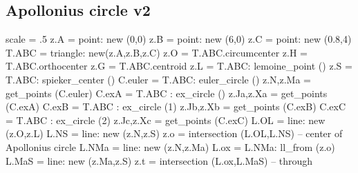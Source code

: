 \hspace*{\fill}
\hspace*{\fill}

\subsection{Apollonius circle v2} %
\label{sub:apollonius_circle_v2}
 \begin{tkzexample}
\begin{tkzelements}
   scale       = .5
   z.A         = point: new (0,0)
   z.B         = point: new (6,0)
   z.C         = point: new (0.8,4)
   T.ABC       = triangle: new(z.A,z.B,z.C)
   z.O         = T.ABC.circumcenter
   z.H         = T.ABC.orthocenter
   z.G         = T.ABC.centroid
   z.L         = T.ABC: lemoine_point ()
   z.S         = T.ABC: spieker_center ()
   C.euler     = T.ABC: euler_circle ()
   z.N,z.Ma    = get_points (C.euler)
   C.exA       = T.ABC : ex_circle ()
   z.Ja,z.Xa   = get_points (C.exA)
   C.exB       = T.ABC : ex_circle (1)
   z.Jb,z.Xb   = get_points (C.exB)
   C.exC       = T.ABC : ex_circle (2)
   z.Jc,z.Xc   = get_points (C.exC)
   L.OL        = line: new (z.O,z.L)
   L.NS        = line: new (z.N,z.S)
   z.o         = intersection (L.OL,L.NS) -- center of Apollonius circle
   L.NMa       = line: new (z.N,z.Ma)
   L.ox        = L.NMa: ll_from (z.o)
   L.MaS       = line: new (z.Ma,z.S)
   z.t         = intersection (L.ox,L.MaS) -- through
\end{tkzelements}

\end{tkzexample}

